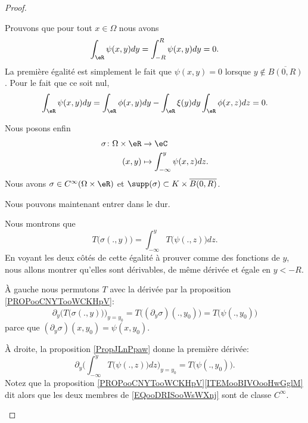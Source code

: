 \begin{proof}
\begin{subproof}
\begin{subproof}
			Prouvons que pour tout \( x\in \Omega\) nous avons
			\begin{equation}
				\int_{\eR}\psi(x,y)dy=\int_{-R}^R\psi(x,y)dy=0.
			\end{equation}
			La première égalité est simplement le fait que \( \psi(x,y)=0\) lorsque \( y\notin \overline{ B(0,R) }\). Pour le fait que ce soit nul,
			\begin{equation}
				\int_{\eR}\psi(x,y)dy=\int_{\eR}\phi(x,y)dy-\int_{\eR}\xi(y)dy\int_{\eR}\phi(x,z)dz=0.
			\end{equation}

			Nous posons enfin
			\begin{equation}
				\begin{aligned}
					\sigma\colon \Omega\times \eR & \to \eC                              \\
					(x,y)                         & \mapsto \int_{-\infty}^y\psi(x,z)dz.
				\end{aligned}
			\end{equation}
			Nous avons \( \sigma\in C^{\infty}(\Omega\times \eR)\) et \( \supp(\sigma)\subset K\times \overline{ B(0,R) }\).
		\end{subproof}
		Nous pouvons maintenant entrer dans le dur.

		\begin{subproof}
			Nous montrons que
			\begin{equation}     \label{EQooDRISooWsWXnj}
				T\big( \sigma(.,y) \big)=\int_{-\infty}^yT\big( \psi(.,z) \big)dz.
			\end{equation}
			En voyant les deux côtés de cette égalité à prouver comme des fonctions de \( y\), nous allons montrer qu'elles sont dérivables, de même dérivée et égale en \( y<-R\).

			À gauche nous permutons \( T\) avec la dérivée par la proposition \ref{PROPooCNYTooWCKHpV}:
			\begin{equation}
				\partial_y\big( T\big( \sigma(.,y) \big) \big)_{y=y_0}=T\big( (\partial_y\sigma)(.,y_0) \big)=T\big( \psi(.,y_0) \big)
			\end{equation}
			parce que \( (\partial_y\sigma)(x,y_0)=\psi(x,y_0)\).

			À droite, la proposition \ref{PropJLnPpaw} donne la première dérivée:
			\begin{equation}
				\partial_y\big( \int_{-\infty}^yT\big( \psi(.,z) \big)dz \big)_{y=y_0}=T\big( \psi(.,y_0) \big).
			\end{equation}
			Notez que la proposition \ref{PROPooCNYTooWCKHpV}\ref{ITEMooBIVOooHwGglM} dit alors que les deux membres de \eqref{EQooDRISooWsWXnj} sont de classe \(  C^{\infty}\).


\end{subproof}
\end{subproof}
\end{proof}
